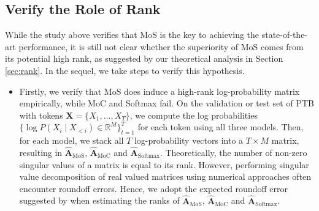 \subsection{Verify the Role of Rank} \label{sec:exp-rank}
While the study above verifies that MoS is the key to achieving the state-of-the-art performance, it is still not clear whether the superiority of MoS comes from its potential high rank, as suggested by our theoretical analysis in Section \ref{sec:rank}.
In the sequel, we take steps to verify this hypothesis. 
\begin{itemize}[leftmargin=*,label=$\bullet$]
\item
Firstly, we verify that MoS does induce a high-rank log-probability matrix empirically, while MoC and Softmax fail.
On the validation or test set of PTB with tokens $\mathbf{X} = \{X_1, \dots, X_T\}$, we compute the log probabilities $\{ \log P(X_i \mid X_{<i}) \in \mathbb{R}^{M}\}_{t=1}^{T}$ for each token using all three models.
Then, for each model, we stack all $T$ log-probability vectors into a $T \times M$ matrix, resulting in $\hat{\mathbf{A}}_\text{MoS}$, $\hat{\mathbf{A}}_\text{MoC}$ and $\hat{\mathbf{A}}_\text{Softmax}$.
Theoretically, the number of non-zero singular values of a matrix is equal to its rank.
However, performing singular value decomposition of real valued matrices using numerical approaches often encounter roundoff errors. 
Hence, we adopt the expected roundoff error suggested by \citet{press2007numerical} when estimating the ranks of $\hat{\mathbf{A}}_\text{MoS}$, $\hat{\mathbf{A}}_\text{MoC}$ and $\hat{\mathbf{A}}_\text{Softmax}$. 


\end{itemize}
